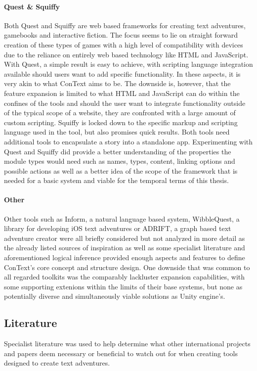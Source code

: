 \paragraph{Quest \& Squiffy} 
Both Quest and Squiffy are web based frameworks for creating text adventures, gamebooks and interactive fiction. The focus seems to lie on straight forward creation of these types of games with a high level of compatibility with devices due to the reliance on entirely web based technology like HTML and JavaScript. With Quest, a simple result is easy to achieve, with scripting language integration available should users want to add specific functionality. In these aspects, it is very akin to what ConText aims to be. The downside is, however, that the feature expansion is limited to what HTML and JavaScript can do within the confines of the tools and should the user want to integrate functionality outside of the typical scope of a website, they are confronted with a large amount of custom scripting. \cite{QUEST}
Squiffy is locked down to the specific markup and scripting language used in the tool, but also promises quick results.
Both tools need additional tools to encapsulate a story into a standalone app. 
Experimenting with Quest and Squiffy did provide a better understanding of the properties the module types would need such as names, types, content, linking options and possible actions as well as a better idea of the scope of the framework that is needed for a basic system and viable for the temporal terms of this thesis. \cite{SQUIFFY}
\paragraph{Other}
Other tools such as Inform\cite{INFORM}, a natural language based system, WibbleQuest\cite{WIBBLE}, a library for developing iOS text adventures or ADRIFT\cite{ADRIFT}, a graph based text adventure creator were all briefly considered but not analyzed in more detail as the already listed sources of inspiration as well as some specialist literature and aforementioned logical inference provided enough aspects and features to define ConText's core concept and structure design. 
One downside that was common to all regarded toolkits was the comparably lackluster expansion capabilities, with some supporting extenions within the limits of their base systems, but none as potentially diverse and simultaneously viable solutions as Unity engine's.

\subsection{Literature}
Specialist literature was used to help determine what other international projects and papers deem necessary or beneficial to watch out for when creating tools designed to create text adventures. 
